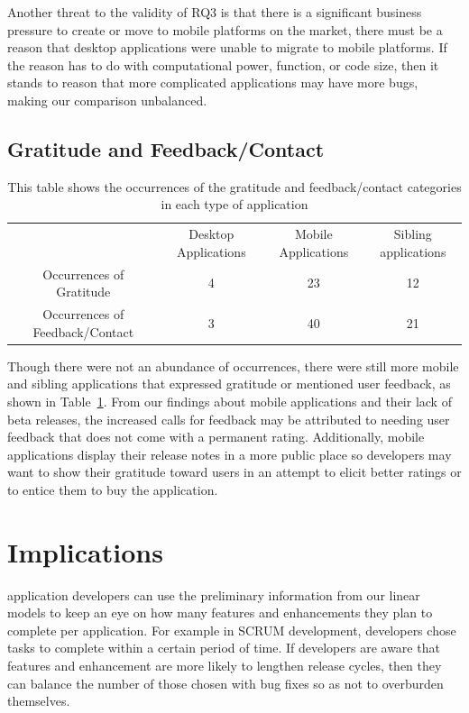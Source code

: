 \documentclass{acm_proc_article-sp}
\begin{document}
Another threat to the validity of RQ3 is that there is a significant business pressure to create \sibs or move to mobile platforms on the market, there must be a reason that desktop applications were unable to migrate to mobile platforms. 
If the reason has to do with computational power, function, or code size, then it stands to reason that more complicated applications may have more bugs, making our comparison unbalanced.


\subsection{Gratitude and Feedback/Contact}

\begin{table}[width=.5\textwidth]
\begin{tabular}{c c c c}
 & Desktop Applications & Mobile Applications & Sibling applications \\
Occurrences of Gratitude & 4 & 23 & 12 \\
Occurrences of Feedback/Contact & 3 & 40 & 21 \\
\end{tabular}
\label{tab:gratandfeed}
\caption{This table shows the occurrences of the gratitude and feedback/contact categories in each type of application}
\end{table}

Though there were not an abundance of occurrences, there were still more mobile and sibling applications that expressed gratitude or mentioned user feedback, as shown in Table~\ref{tab:gratandfeed}.
From our findings about mobile applications and their lack of beta releases, the increased calls for feedback may be attributed to needing user feedback that does not come with a permanent rating.
Additionally, mobile applications display their release notes in a more public place so developers may want to show their gratitude toward users in an attempt to elicit better ratings or to entice them to buy the application.

\section{Implications}

 application developers can use the preliminary information from our linear models to keep an eye on how many features and enhancements they plan to complete per application. For example in SCRUM development, developers chose tasks to complete within a certain period of time.
If developers are aware that features and enhancement are more likely to lengthen release cycles, then they can balance the number of those chosen with bug fixes so as not to overburden themselves.
\end{document}
